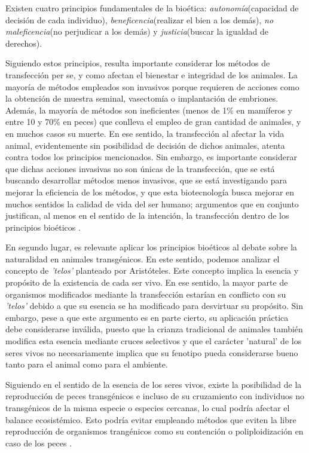 \documentclass[fleqn,10pt]{SelfArx} %
\begin{document}
Existen cuatro principios fundamentales de la bioética: \textit{autonomía}(capacidad de decisión de cada individuo), \textit{beneficencia}(realizar el bien a los demás), \textit{no maleficencia}(no perjudicar a los demás) y \textit{justicia}(buscar la igualdad de derechos)\cite{Cooley, tsai2005bioethical}.

Siguiendo estos principios, resulta importante considerar los métodos de transfección per se, y como afectan el bienestar e integridad de los animales. La mayoría de métodos empleados son invasivos porque requieren de acciones como la obtención de muestra seminal, vasectomía o implantación de embriones. Además, la mayoría de métodos son ineficientes (menos de 1\% en mamíferos y entre 10 y 70\% en peces)  que conlleva el empleo de gran cantidad de animales, y en muchos casos su muerte. En ese sentido, la transfección al afectar la vida animal, evidentemente sin posibilidad de decisión de dichos animales, atenta contra todos los principios mencionados. Sin embargo, es importante considerar que dichas acciones invasivas no son únicas de la transfección, que se está buscando desarrollar métodos menos invasivos, que se está investigando para mejorar la eficiencia de los métodos, y que esta biotecnología busca mejorar en muchos sentidos la calidad de vida del ser humano; argumentos que en conjunto justifican, al menos en el sentido de la intención, la transfección dentro de los principios bioéticos \cite{mepham1998use,christiansen2000bioethics, lassen2006after, niemann2007transgenic, Ormandy}. 

En segundo lugar, es relevante aplicar los principios bioéticos al debate sobre la naturalidad en animales transgénicos. En este sentido, podemos analizar el concepto de \textit{'telos'} planteado por Aristóteles. Este concepto implica la esencia y propósito de la existencia de cada ser vivo. En ese sentido, la mayor parte de organismos modificados mediante la transfección estarían en conflicto con su \textit{'telos'} debido a que su esencia se ha modificado para desvirtuar su propósito\cite{Rollin1998}. Sin embargo, pese a que este argumento es en parte cierto, su aplicación práctica debe considerarse inválida, puesto que la crianza tradicional de animales también modifica esta esencia mediante cruces selectivos y que el carácter 'natural' de los seres vivos no necesariamente implica que su fenotipo pueda considerarse bueno tanto para el animal como para el ambiente\cite{Verhoog2003294, Ormandy}. 

Siguiendo en el sentido de la esencia de los seres vivos, existe la posibilidad de la reproducción de peces transgénicos e incluso de su cruzamiento con individuos no transgénicos de la misma especie o especies cercanas, lo cual podría afectar el balance ecosistémico\cite{espinoza2012reproduccion, oke2013hybridization}. Esto podría evitar empleando métodos que eviten la libre reproducción de organismos trangénicos como su contención o poliploidización en caso de los peces \cite{pandian1998ploidy,wong2008transgenic}.
\end{document}
